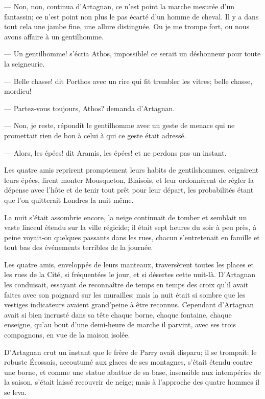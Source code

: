 — Non, non, continua d'Artagnan, ce n'est point la marche mesurée d'un fantassin; ce n'est point non plus le pas écarté d'un homme de cheval. Il y a dans tout cela une jambe fine, une allure distinguée. Ou je me trompe fort, ou nous avons affaire à un gentilhomme.

— Un gentilhomme! s'écria Athos, impossible! ce serait un déshonneur pour toute la seigneurie.

— Belle chasse! dit Porthos avec un rire qui fit trembler les vitres; belle chasse, mordieu!

— Partez-vous toujours, Athos? demanda d'Artagnan.

— Non, je reste, répondit le gentilhomme avec un geste de menace qui ne promettait rien de bon à celui à qui ce geste était adressé.

— Alors, les épées! dit Aramis, les épées! et ne perdons pas un instant.

Les quatre amis reprirent promptement leurs habits de gentilshommes, ceignirent leurs épées, firent monter Mousqueton, Blaisois, et leur ordonnèrent de régler la dépense avec l'hôte et de tenir tout prêt pour leur départ, les probabilités étant que l'on quitterait Londres la nuit même.

La nuit s'était assombrie encore, la neige continuait de tomber et semblait un vaste linceul étendu sur la ville régicide; il était sept heures du soir à peu près, à peine voyait-on quelques passants dans les rues, chacun s'entretenait en famille et tout bas des événements terribles de la journée.

Les quatre amis, enveloppés de leurs manteaux, traversèrent toutes les places et les rues de la Cité, si fréquentées le jour, et si désertes cette nuit-là. D'Artagnan les conduisait, essayant de reconnaître de temps en temps des croix qu'il avait faites avec son poignard sur les murailles; mais la nuit était si sombre que les vestiges indicateurs avaient grand'peine à être reconnus. Cependant d'Artagnan avait si bien incrusté dans sa tête chaque borne, chaque fontaine, chaque enseigne, qu'au bout d'une demi-heure de marche il parvint, avec ses trois compagnons, en vue de la maison isolée.

D'Artagnan crut un instant que le frère de Parry avait disparu; il se trompait: le robuste Écossais, accoutumé aux glaces de ses montagnes, s'était étendu contre une borne, et comme une statue abattue de sa base, insensible aux intempéries de la saison, s'était laissé recouvrir de neige; mais à l'approche des quatre hommes il se leva.

